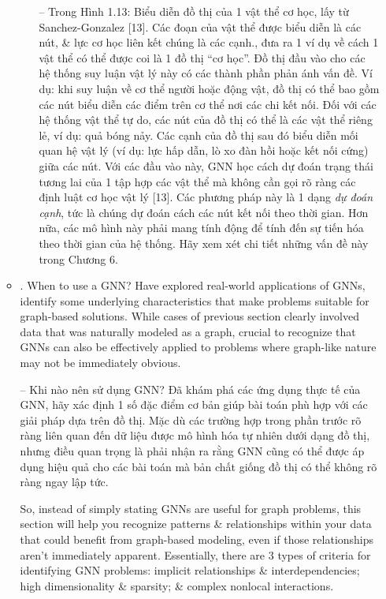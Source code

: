 \documentclass{article}
\begin{document}
\begin{itemize}
\begin{itemize}
\begin{itemize}
            -- Trong {\sf Hình 1.13: Biểu diễn đồ thị của 1 vật thể cơ học, lấy từ Sanchez-Gonzalez [13]. Các đoạn của vật thể được biểu diễn là các nút, \& lực cơ học liên kết chúng là các cạnh.}, đưa ra 1 ví dụ về cách 1 vật thể có thể được coi là 1 đồ thị ``cơ học''. Đồ thị đầu vào cho các hệ thống suy luận vật lý này có các thành phần phản ánh vấn đề. Ví dụ: khi suy luận về cơ thể người hoặc động vật, đồ thị có thể bao gồm các nút biểu diễn các điểm trên cơ thể nơi các chi kết nối. Đối với các hệ thống vật thể tự do, các nút của đồ thị có thể là các vật thể riêng lẻ, ví dụ: quả bóng nảy. Các cạnh của đồ thị sau đó biểu diễn mối quan hệ vật lý (ví dụ: lực hấp dẫn, lò xo đàn hồi hoặc kết nối cứng) giữa các nút. Với các đầu vào này, GNN học cách dự đoán trạng thái tương lai của 1 tập hợp các vật thể mà không cần gọi rõ ràng các định luật cơ học vật lý [13]. Các phương pháp này là 1 dạng {\it dự đoán cạnh}, tức là chúng dự đoán cách các nút kết nối theo thời gian. Hơn nữa, các mô hình này phải mang tính động để tính đến sự tiến hóa theo thời gian của hệ thống. Hãy xem xét chi tiết những vấn đề này trong Chương 6.
        \end{itemize}
        \item {. When to use a GNN?} Have explored real-world applications of GNNs, identify some underlying characteristics that make problems suitable for graph-based solutions. While cases of previous section clearly involved data that was naturally modeled as a graph, crucial to recognize that GNNs can also be effectively applied to problems where graph-like nature may not be immediately obvious.

        -- {\sf Khi nào nên sử dụng GNN?} Đã khám phá các ứng dụng thực tế của GNN, hãy xác định 1 số đặc điểm cơ bản giúp bài toán phù hợp với các giải pháp dựa trên đồ thị. Mặc dù các trường hợp trong phần trước rõ ràng liên quan đến dữ liệu được mô hình hóa tự nhiên dưới dạng đồ thị, nhưng điều quan trọng là phải nhận ra rằng GNN cũng có thể được áp dụng hiệu quả cho các bài toán mà bản chất giống đồ thị có thể không rõ ràng ngay lập tức.

        So, instead of simply stating GNNs are useful for graph problems, this section will help you recognize patterns \& relationships within your data that could benefit from graph-based modeling, even if those relationships aren't immediately apparent. Essentially, there are 3 types of criteria for identifying GNN problems: implicit relationships \& interdependencies; high dimensionality \& sparsity; \& complex nonlocal interactions.


\end{itemize}
\end{itemize}
\end{document}
